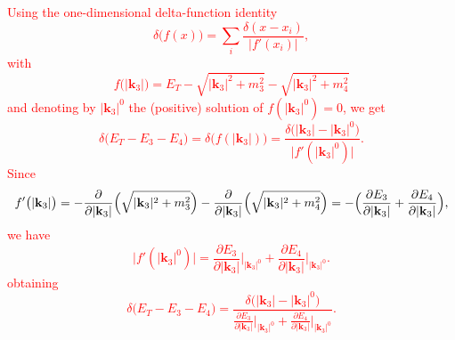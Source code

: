 \documentclass[11pt]{article}
\numberwithin{equation}{section}
\begin{document}
    \textcolor{red}{Using the one-dimensional delta-function identity
\[
\delta\bigl(f(x)\bigr)
=\sum_{i}\frac{\delta(x-x_i)}{\bigl|f'(x_i)\bigr|},
\]
with
\[
f\bigl(|\mathbf{k}_3|\bigr)
=E_T - \sqrt{|\mathbf{k}_3|^2 + m_3^2}
         - \sqrt{|\mathbf{k}_3|^2 + m_4^2}
\]
and denoting by $|\mathbf{k}_3|^0$ the (positive) solution of $f(|\mathbf{k}_3|^0)=0$, we get
\[
\delta\bigl(E_T - E_3 - E_4\bigr)
=\delta\bigl(f(|\mathbf{k}_3|)\bigr)
=\frac{\delta\bigl(|\mathbf{k}_3| - |\mathbf{k}_3|^0\bigr)}
      {\bigl|f'(|\mathbf{k}_3|^0)\bigr|}.
\]
Since
\[
f'\bigl(|\mathbf{k}_3|\bigr)
=-\frac{\partial}{\partial|\mathbf{k}_3|}
 \Bigl(\sqrt{|\mathbf{k}_3|^2 + m_3^2}\Bigr)
-\frac{\partial}{\partial|\mathbf{k}_3|}
 \Bigl(\sqrt{|\mathbf{k}_3|^2 + m_4^2}\Bigr)
=-\Bigl(\frac{\partial E_3}{\partial|\mathbf{k}_3|}
     +\frac{\partial E_4}{\partial|\mathbf{k}_3|}\Bigr),
\]
we have
\[
\bigl|f'(|\mathbf{k}_3|^0)\bigr|
=\frac{\partial E_3}{\partial|\mathbf{k}_3|}\Big|_{|\mathbf{k}_3|^0}
+\frac{\partial E_4}{\partial|\mathbf{k}_3|}\Big|_{|\mathbf{k}_3|^0}.
\]
obtaining
\[
\delta\bigl(E_T - E_3 - E_4\bigr)
=\frac{
  \delta\bigl(|\mathbf{k}_3| - |\mathbf{k}_3|^0\bigr)
}{
  \displaystyle
  \frac{\partial E_3}{\partial|\mathbf{k}_3|}\Big|_{|\mathbf{k}_3|^0}
  +\frac{\partial E_4}{\partial|\mathbf{k}_3|}\Big|_{|\mathbf{k}_3|^0}
}.
\]}
\end{document}
